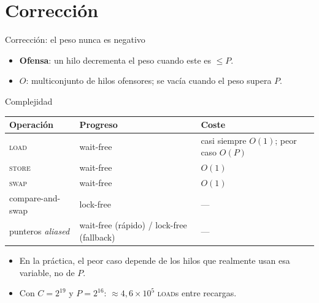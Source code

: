 \documentclass[aspectratio=169,11pt,xcolor=table]{beamer}
\begin{document}
\section{Corrección}
\begin{frame}{Corrección: el peso nunca es negativo}
  \begin{itemize}
    \item \textbf{Ofensa}: un hilo decrementa el peso cuando este es $\leq P$.
    \item $O$: multiconjunto de hilos ofensores; se vacía cuando el peso supera $P$.
  \end{itemize}
  \vspace{1mm}
\end{frame}

\begin{frame}{Complejidad}
  \centering
  \begin{tabular}{@{}lll@{}}
    \toprule
    \textbf{Operación} & \textbf{Progreso} & \textbf{Coste} \\
    \midrule
    \textsc{load}   & wait-free & casi siempre $O(1)$; peor caso $O(P)$ \\
    \textsc{store}  & wait-free & $O(1)$ \\
    \textsc{swap}   & wait-free & $O(1)$ \\
    compare-and-swap & lock-free & --- \\
    punteros \emph{aliased} & wait-free (rápido) / lock-free (fallback) & --- \\
    \bottomrule
  \end{tabular}
  \vspace{4mm}
  \begin{itemize}
    \item En la práctica, el peor caso depende de los hilos que \alert{realmente} usan esa variable, no de $P$.
    \item Con $C=2^{19}$ y $P=2^{16}$: $\approx 4{,}6\times10^5$ \textsc{load}s entre recargas.
  \end{itemize}
\end{frame}
\end{document}
